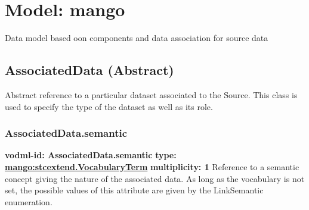 
%



    
    
    
    
    
    
      

\pagebreak
\section{Model: mango }
  

  Data model based oon components and data association for source data

  \subsection{AssociatedData (Abstract)}
  \label{sect:AssociatedData}
    Abstract reference to a particular dataset associated to the Source. This class is used to specify the type of the dataset as well as its role.

    \subsubsection{AssociatedData.semantic}
      \textbf{vodml-id: AssociatedData.semantic} \newline
      \textbf{type: \hyperref[sect:stcextend.VocabularyTerm]{mango:stcextend.VocabularyTerm}} \newline
      \textbf{multiplicity: 1} \newline 
      Reference to a semantic concept giving the nature of the associated data. As long as the vocabulary is not set, the possible values of this attribute are given by the LinkSemantic enumeration.

